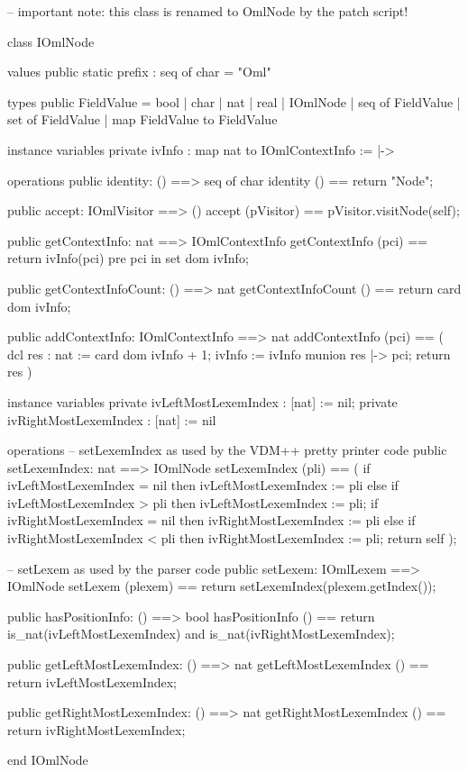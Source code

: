 \begin{vdm_al}
-- important note: this class is renamed to OmlNode by the patch script!

class IOmlNode

values
  public static prefix : seq of char = "Oml"

types
  public FieldValue = 
    bool | char | nat | real | IOmlNode | 
    seq of FieldValue |
    set of FieldValue |
    map FieldValue to FieldValue

instance variables
  private ivInfo : map nat to IOmlContextInfo := {|->}

operations
  public identity: () ==> seq of char
  identity () == return "Node";

  public accept: IOmlVisitor ==> ()
  accept (pVisitor) == pVisitor.visitNode(self);

  public getContextInfo: nat ==> IOmlContextInfo
  getContextInfo (pci) == return ivInfo(pci)
    pre pci in set dom ivInfo;

  public getContextInfoCount: () ==> nat
  getContextInfoCount () == return card dom ivInfo;

  public addContextInfo: IOmlContextInfo ==> nat
  addContextInfo (pci) ==
    ( dcl res : nat := card dom ivInfo + 1;
      ivInfo := ivInfo munion {res |-> pci};
      return res )

instance variables
  private ivLeftMostLexemIndex : [nat] := nil;
  private ivRightMostLexemIndex : [nat] := nil

operations
  -- setLexemIndex as used by the VDM++ pretty printer code
  public setLexemIndex: nat ==> IOmlNode
  setLexemIndex (pli) ==
    ( if ivLeftMostLexemIndex = nil
      then ivLeftMostLexemIndex := pli
      else if ivLeftMostLexemIndex > pli
           then ivLeftMostLexemIndex := pli;
      if ivRightMostLexemIndex = nil
      then ivRightMostLexemIndex := pli
      else if ivRightMostLexemIndex < pli
           then ivRightMostLexemIndex := pli;
      return self );

  -- setLexem as used by the parser code
  public setLexem: IOmlLexem ==> IOmlNode
  setLexem (plexem) == return setLexemIndex(plexem.getIndex());

  public hasPositionInfo: () ==> bool
  hasPositionInfo () == return is_nat(ivLeftMostLexemIndex) and is_nat(ivRightMostLexemIndex);

  public getLeftMostLexemIndex: () ==> nat
  getLeftMostLexemIndex () == return ivLeftMostLexemIndex;

  public getRightMostLexemIndex: () ==> nat
  getRightMostLexemIndex () == return ivRightMostLexemIndex;

end IOmlNode
\end{vdm_al}

